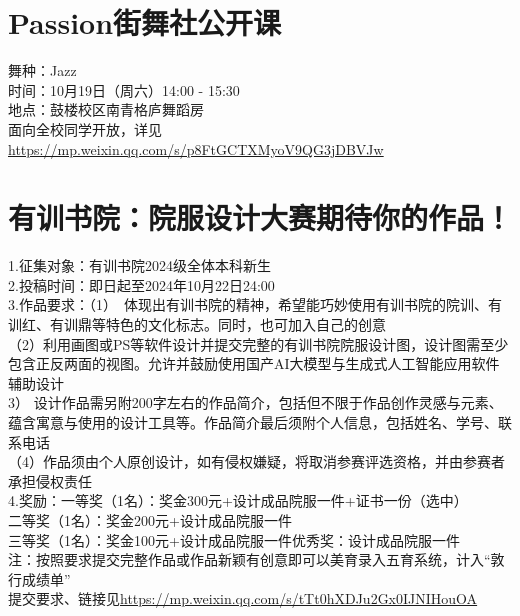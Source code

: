\documentclass[letterpaper, 12pt]{article}
\begin{document}
\begin{multicols}{2}
\section{Passion街舞社公开课}
舞种：Jazz\\
时间：10月19日（周六）14:00 - 15:30\\
地点：鼓楼校区南青格庐舞蹈房\\
面向全校同学开放，详见\url{https://mp.weixin.qq.com/s/p8FtGCTXMyoV9QG3jDBVJw}

\section{有训书院：院服设计大赛期待你的作品！}
1.征集对象：有训书院2024级全体本科新生\\
2.投稿时间：即日起至2024年10月22日24:00\\
3.作品要求：（1） 体现出有训书院的精神，希望能巧妙使用有训书院的院训、有训红、有训鼎等特色的文化标志。同时，也可加入自己的创意\\
（2）利用画图或PS等软件设计并提交完整的有训书院院服设计图，设计图需至少包含正反两面的视图。允许并鼓励使用国产AI大模型与生成式人工智能应用软件辅助设计\\
3） 设计作品需另附200字左右的作品简介，包括但不限于作品创作灵感与元素、蕴含寓意与使用的设计工具等。作品简介最后须附个人信息，包括姓名、学号、联系电话\\
（4）作品须由个人原创设计，如有侵权嫌疑，将取消参赛评选资格，并由参赛者承担侵权责任\\
4.奖励：一等奖（1名）：奖金300元+设计成品院服一件+证书一份（选中）\\
二等奖（1名）：奖金200元+设计成品院服一件\\
三等奖（1名）：奖金100元+设计成品院服一件优秀奖：设计成品院服一件\\
注：按照要求提交完整作品或作品新颖有创意即可以美育录入五育系统，计入“敦行成绩单”\\
提交要求、链接见\url{https://mp.weixin.qq.com/s/tTt0hXDJu2Gx0IJNIHouOA}

\end{multicols} 
\end{document}

